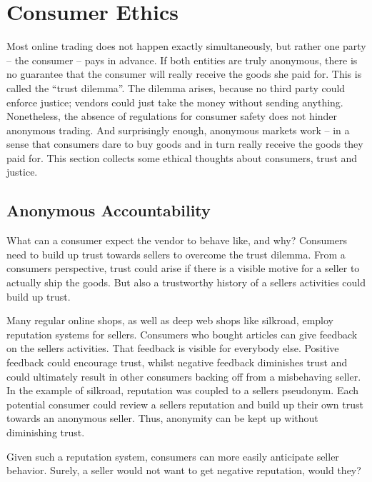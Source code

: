 \section{Consumer Ethics}
\label{consumers}

Most online trading does not happen exactly simultaneously, but rather one party -- the consumer -- pays in advance. If both entities are truly anonymous, there is no guarantee that the consumer will really receive the goods she paid for. This is called the ``trust dilemma''\cite{internetTrust2004}. The dilemma arises, because no third party could enforce justice; vendors could just take the money without sending anything. Nonetheless, the absence of regulations for consumer safety does not hinder anonymous trading. And surprisingly enough, anonymous markets work -- in a sense that consumers dare to buy goods and in turn really receive the goods they paid for\cite{silkroad2013}. This section collects some ethical thoughts about consumers, trust and justice. 

\subsection{Anonymous Accountability}

What can a consumer expect the vendor to behave like, and why? Consumers need to build up trust towards sellers to overcome the trust dilemma\cite{internetTrust2004}. From a consumers perspective, trust could arise if there is a visible motive for a seller to actually ship the goods. But also a trustworthy history of a sellers activities could build up trust.

Many regular online shops, as well as deep web shops like silkroad, employ reputation systems for sellers\cite{internetTrust2004, silkroad2013}. Consumers who bought articles can give feedback on the sellers activities. That feedback is visible for everybody else. Positive feedback could encourage trust, whilst negative feedback diminishes trust and could ultimately result in other consumers backing off from a misbehaving seller\cite{internetTrust2004}. In the example of silkroad, reputation was coupled to a sellers pseudonym\cite{silkroad2013}. Each potential consumer could review a sellers reputation and build up their own trust towards an anonymous seller. Thus, anonymity can be kept up without diminishing trust\cite{internetTrust2004}.

Given such a reputation system, consumers can more easily anticipate seller behavior. Surely, a seller would not want to get negative reputation, would they?

